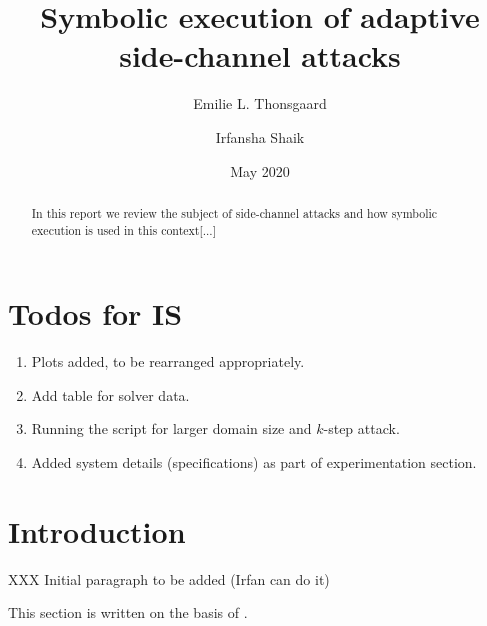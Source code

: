 \documentclass[11pt,a4paper,notitlepage]{article}
\title{Symbolic execution of adaptive side-channel attacks}
\author{Emilie L. Thonsgaard \and Irfansha Shaik}
\date{May 2020}
\begin{document}
\begin{titlingpage}
    \maketitle
    \begin{abstract}
        In this report we review the subject of side-channel attacks and how symbolic execution is used in this context[...]
    \end{abstract}
\end{titlingpage}

\tableofcontents
\newpage
\setcounter{section}{-1}


\section{Todos for IS}
\label{sec:todosforis}

\begin{enumerate}
  \item Plots added, to be rearranged appropriately.
  \item Add table for solver data.
  \item Running the script for larger domain size and $k$-step attack.
  \item Added system details (specifications) as part of experimentation section.
\end{enumerate}

\newpage

\section{Introduction}
\label{cha:introduction}

XXX Initial paragraph to be added (Irfan can do it)

This section is written on the basis of \cite{phan2017synthesis}.
\end{document}
